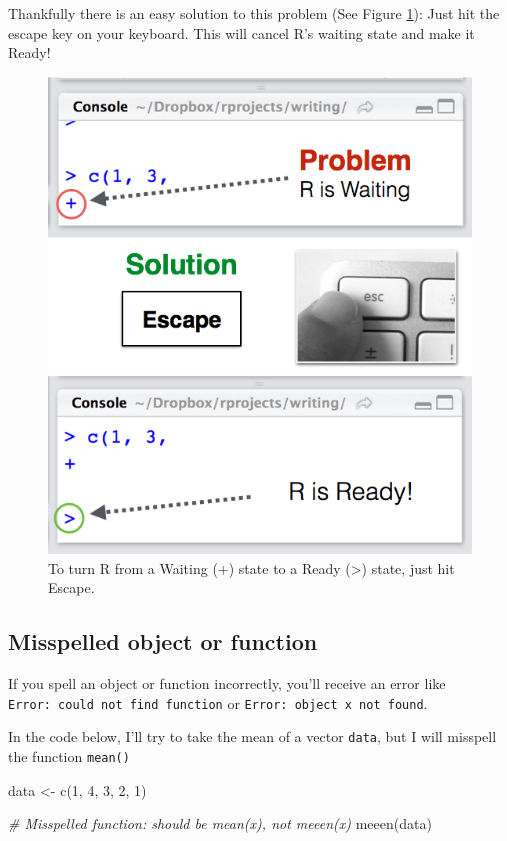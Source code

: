 \documentclass[
]{book}
\newenvironment{Shaded}{\begin{snugshade}}{\end{snugshade}}
\newcommand{\CommentTok}[1]{\textcolor[rgb]{0.56,0.35,0.01}{\textit{#1}}}
\newcommand{\DecValTok}[1]{\textcolor[rgb]{0.00,0.00,0.81}{#1}}
\newcommand{\FunctionTok}[1]{\textcolor[rgb]{0.00,0.00,0.00}{#1}}
\newcommand{\NormalTok}[1]{#1}
\newcommand{\OtherTok}[1]{\textcolor[rgb]{0.56,0.35,0.01}{#1}}
\begin{document}
Thankfully there is an easy solution to this problem (See Figure \ref{fig:rstate}): Just hit the escape key on your keyboard. This will cancel R's waiting state and make it Ready!

\begin{figure}

{\centering \includegraphics[width=0.5\linewidth]{images/chapter-1/escapesolution} 

}

\caption{To turn R from a Waiting (+) state to a Ready (>) state, just hit Escape.}\label{fig:rstate}
\end{figure}

\hypertarget{misspelled-object-or-function}{%
\subsection{Misspelled object or function}\label{misspelled-object-or-function}}

If you spell an object or function incorrectly, you'll receive an error like \texttt{Error:\ could\ not\ find\ function} or \texttt{Error:\ object\ \textquotesingle{}x\textquotesingle{}\ not\ found}.

In the code below, I'll try to take the mean of a vector \texttt{data}, but I will misspell the function \texttt{mean()}

\begin{Shaded}
\begin{Highlighting}[]
\NormalTok{data }\OtherTok{\textless{}{-}} \FunctionTok{c}\NormalTok{(}\DecValTok{1}\NormalTok{, }\DecValTok{4}\NormalTok{, }\DecValTok{3}\NormalTok{, }\DecValTok{2}\NormalTok{, }\DecValTok{1}\NormalTok{)}

\CommentTok{\# Misspelled function: should be mean(x), not meeen(x)}
\FunctionTok{meeen}\NormalTok{(data)}
\end{Highlighting}
\end{Shaded}
\end{document}
